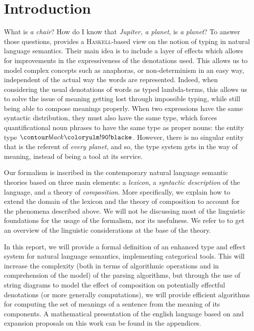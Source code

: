 \section*{Introduction}
What is \emph{a chair}? How do I know that \emph{Jupiter, a planet}, is
\emph{a planet}?
To answer those questions, \cite{bumfordEffectdrivenInterpretationFunctors2025}
provides a \textsc{Haskell}-based view on the notion of typing in natural
language semantics.
Their main idea is to include a layer of effects which allows for improvements
in the expressiveness of the denotations used.
This allows us to model complex concepts such as anaphoras, or non-determinism
in an easy way, independent of the actual way the words are represented.
Indeed, when considering the usual denotations of words as typed lambda-terms,
this allows us to solve the issue of meaning getting lost through impossible
typing, while still being able to compose meanings properly.
When two expressions have the same syntactic distribution, they must also have
the same type, which forces quantificational noun phrases to have the same type
as proper nouns: the entity type $\e$.
However, there is no singular entity that is the referent of \emph{every
	planet}, and so, the type system gets in the way of meaning, instead of being
a tool at its service.

Our formalism is inscribed in the contemporary natural language semantic
theories based on three main elements: a \emph{lexicon}, a
\emph{syntactic description} of the language, and a theory of
\emph{composition}.
More specifically, we explain how to extend the domain of the lexicon and the
theory of composition to account for the phenomena described above.
We will not be discussing most of the linguistic foundations for the usage of
the formalism, nor its usefulness.
We refer to \cite{bumfordEffectdrivenInterpretationFunctors2025} to get an
overview of the linguistic considerations at the base of the theory.

In this report, we will provide a formal definition of an enhanced type and
effect system for natural language semantics, implementing categorical tools.
This will increase the complexity (both in terms of algorithmic operations and
in comprehension of the model) of the parsing algorithms, but through the use
of string diagrams to model the effect of composition on potentially effectful
denotations (or more generally computations), we will provide efficient
algorithms for computing the set of meanings of a sentence from the meaning of
its components.
A mathematical presentation of the english language based on
\cite{bumfordEffectdrivenInterpretationFunctors2025} and expansion proposals on
this work can be found in the appendices.

